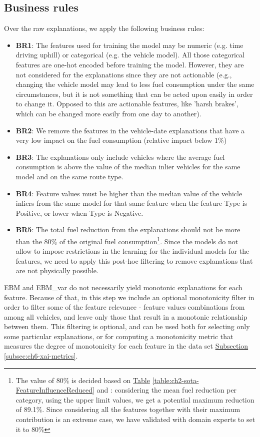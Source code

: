 \subsection{Business rules}\label{subsec:ch6-business-rules}
Over the raw explanations, we apply the following business rules:
\begin{itemize}
\item \textbf{BR1}: The features used for training the model may be numeric (e.g. time driving uphill) or categorical (e.g. the vehicle model). All those categorical features are one-hot encoded before training the model. However, they are not considered for the explanations since they are not actionable (e.g., changing the vehicle model may lead to less fuel consumption under the same circumstances, but it is not something that can be acted upon easily in order to change it. Opposed to this are actionable features, like 'harsh brakes', which can be changed more easily from one day to another).
\item \textbf{BR2}: We remove the features in the vehicle-date explanations that have a very low impact on the fuel consumption (relative impact below 1\%)
\item \textbf{BR3}: The explanations only include vehicles where the average fuel consumption is above the value of the median inlier vehicles for the same model and on the same route type.
\item \textbf{BR4}: Feature values must be higher than the median value of the vehicle inliers from the same model for that same feature when the feature Type is Positive, or lower when Type is Negative.
\item \textbf{BR5}: The total fuel reduction from the explanations should not be more than the 80\% of the original fuel consumption\footnote{The value of 80\% is decided based on \hyperref[table:ch2-sota-FeatureInfluenceReduced]{Table} \ref{table:ch2-sota-FeatureInfluenceReduced} and \parencite{zacharof2016review}: considering the mean fuel reduction per category, using the upper limit values, we get a potential maximum reduction of 89.1\%. Since considering all the features together with their maximum contribution is an extreme case, we have validated with domain experts to set it to 80\%}. Since the models do not allow to impose restrictions in the learning for the individual models for the features, we need to apply this post-hoc filtering to remove explanations that are not physically possible.
\end{itemize}
EBM and EBM\_var do not necessarily yield monotonic explanations for each feature. Because of that, in this step we include an optional monotonicity filter in order to filter some of the feature relevance - feature values combinations from among all vehicles, and leave only those that result in a monotonic relationship between them. This filtering is optional, and can be used both for selecting only some particular explanations, or for computing a monotonicity metric that measures the degree of monotonicity for each feature in the data set \hyperref[subsec:ch6-xai-metrics]{Subsection} \ref{subsec:ch6-xai-metrics}. 

